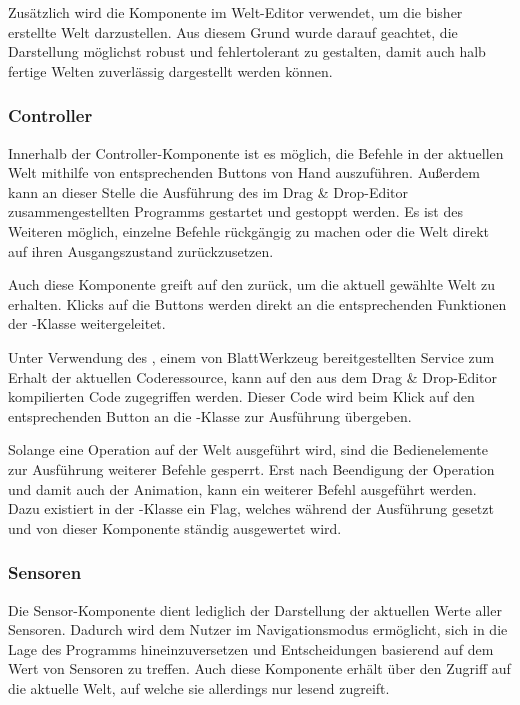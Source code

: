 Zusätzlich wird die Komponente im Welt-Edi\-tor verwendet, um die bisher erstellte Welt darzustellen. Aus diesem Grund wurde darauf geachtet, die Darstellung möglichst robust und fehlertolerant zu gestalten, damit auch halb fertige Welten zuverlässig dargestellt werden können.

\subsubsection{Controller}
\label{sec:implementation:integration:controller}

Innerhalb der Con\-trol\-ler-Kom\-po\-nen\-te ist es möglich, die Befehle in der aktuellen Welt mithilfe von entsprechenden Buttons von Hand auszuführen. Außerdem kann an dieser Stelle die Ausführung des im Drag \& Drop-Edi\-tor zusammengestellten Programms gestartet und gestoppt werden. Es ist des Weiteren möglich, einzelne Befehle rückgängig zu machen oder die Welt direkt auf ihren Ausgangszustand zurückzusetzen.

Auch diese Komponente greift auf den  zurück, um die aktuell gewählte Welt zu erhalten. Klicks auf die Buttons werden direkt an die entsprechenden Funktionen der -Klas\-se weitergeleitet.

Unter Verwendung des , einem von BlattWerkzeug bereitgestellten Service zum Erhalt der aktuellen Coderessource, kann auf den aus dem Drag \& Drop-Edi\-tor kompilierten Code zugegriffen werden. Dieser Code wird beim Klick auf den entsprechenden Button an die -Klas\-se zur Ausführung übergeben.

Solange eine Operation auf der Welt ausgeführt wird, sind die Bedienelemente zur Ausführung weiterer Befehle gesperrt. Erst nach Beendigung der Operation und damit auch der Animation, kann ein weiterer Befehl ausgeführt werden. Dazu existiert in der -Klas\-se ein Flag, welches während der Ausführung gesetzt und von dieser Komponente ständig ausgewertet wird.

\subsubsection{Sensoren}
\label{sec:implementation:integration:sensors}

Die Sen\-sor-Kom\-po\-nen\-te dient lediglich der Darstellung der aktuellen Werte aller Sensoren. Dadurch wird dem Nutzer im Navigationsmodus ermöglicht, sich in die Lage des Programms hineinzuversetzen und Entscheidungen basierend auf dem Wert von Sensoren zu treffen. Auch diese Komponente erhält über den  Zugriff auf die aktuelle Welt, auf welche sie allerdings nur lesend zugreift.

